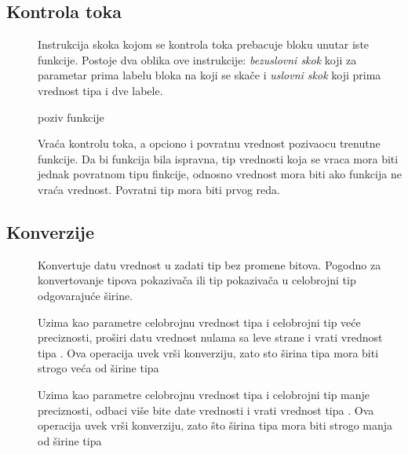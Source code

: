 \subsection*{Kontrola toka}

\begin{description}
\item[] Instrukcija skoka kojom se kontrola toka prebacuje bloku unutar iste funkcije. Postoje dva oblika ove instrukcije: \textit{bezuslovni skok} koji za parametar prima labelu bloka na koji se skače i \textit{uslovni skok} koji prima vrednost tipa  i dve labele.
\item[] poziv funkcije
\item[] Vraća kontrolu toka, a opciono i povratnu vrednost pozivaocu trenutne funkcije. Da bi funkcija bila ispravna, tip vrednosti koja se vraca mora biti jednak povratnom tipu finkcije, odnosno vrednost mora biti  ako funkcija ne vraća vrednost. Povratni tip mora biti prvog reda.
\end{description}

\subsection*{Konverzije}

\begin{description}
\item[] Konvertuje datu vrednost u zadati tip bez promene bitova. Pogodno za konvertovanje tipova pokazivača ili tip pokazivača u celobrojni tip odgovarajuće širine.
\item[]
\item[] Uzima kao parametre celobrojnu vrednost tipa  i celobrojni tip  veće preciznosti, proširi datu vrednost nulama sa leve strane i vrati vrednost tipa . Ova operacija uvek vrši konverziju, zato sto širina tipa  mora biti strogo veća od širine tipa 
\item[] Uzima kao parametre celobrojnu vrednost tipa  i celobrojni tip  manje preciznosti, odbaci više bite date vrednosti i vrati vrednost tipa . Ova operacija uvek vrši konverziju, zato što širina tipa  mora biti strogo manja od širine tipa 
\end{description}
